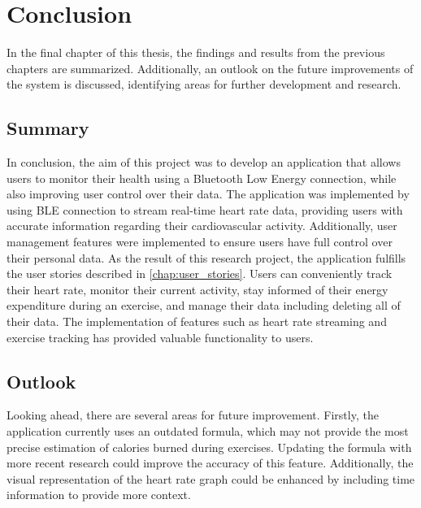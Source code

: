 \chapter{Conclusion}
In the final chapter of this thesis, the findings and results from the previous chapters are summarized. 
Additionally, an outlook on the future improvements of the system is discussed, identifying areas for further development and research. 

\section{Summary}
In conclusion, the aim of this project was to develop an application that allows users to monitor their health using a Bluetooth Low Energy connection, while also improving user control over their data. 
The application was implemented by using BLE connection to stream real-time heart rate data, providing users with accurate information regarding their cardiovascular activity. 
Additionally, user management features were implemented to ensure users have full control over their personal data.
As the result of this research project, the application fulfills the user stories described in \autoref{chap:user_stories}.
Users can conveniently track their heart rate, monitor their current activity, stay informed of their energy expenditure during an exercise, and manage their data including deleting all of their data. 
The implementation of features such as heart rate streaming and exercise tracking has provided valuable functionality to users.

\section{Outlook}
Looking ahead, there are several areas for future improvement. 
Firstly, the application currently uses an outdated formula, which may not provide the most precise estimation of calories burned during exercises. 
Updating the formula with more recent research could improve the accuracy of this feature.
Additionally, the visual representation of the heart rate graph could be enhanced by including time information to provide more context.